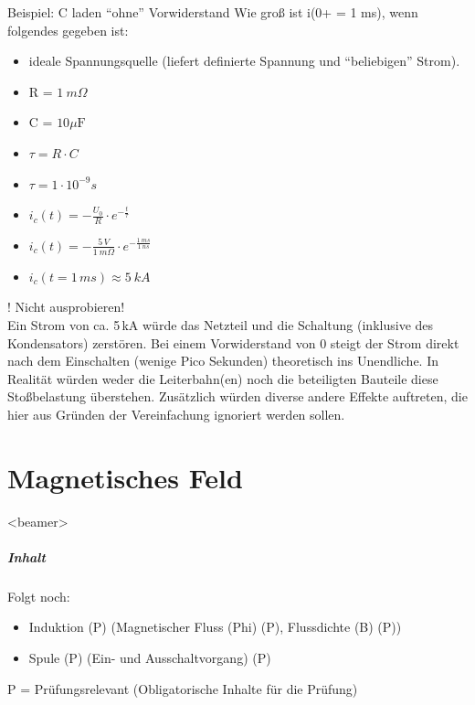 \begin{frame}{Beispiel: C laden "`ohne"' Vorwiderstand}
 Wie groß ist i(0+ = 1 ms), wenn folgendes gegeben ist:
 \begin{itemize}
  \item ideale Spannungsquelle (liefert definierte Spannung und "`beliebigen"' Strom).
  \item R = $1\ m\Omega$
  \item C = $10\mu \text{F}$
  \pause
  \item $\tau = R\cdot C$
  \item $\tau = 1\cdot 10^{-9}s$
  \pause
  \item $i_c(t) = -\frac{U_0}{R}\cdot e^{-\frac{t}{\tau}}$
  \item $i_c(t) = -\frac{5\, V}{1\ m\Omega}\cdot e^{-\frac{1\ ms}{1\  ns}}$
  \pause
  \item $i_c (t= 1\, ms) \approx 5\ kA$
 \end{itemize}
\end{frame}
! Nicht ausprobieren!\\
Ein Strom von ca. 5\,kA würde das Netzteil und die Schaltung (inklusive des Kondensators) zerstören. Bei einem Vorwiderstand von 0 steigt der Strom direkt nach dem Einschalten (wenige Pico Sekunden) theoretisch ins Unendliche. In Realität würden weder die Leiterbahn(en) noch die beteiligten Bauteile diese Stoßbelastung überstehen. Zusätzlich würden diverse andere Effekte auftreten, die hier aus Gründen der Vereinfachung ignoriert werden sollen.

\part{Magnetisches Feld}
\begin{frame}
  \partpage
  \hypertarget{Teil_2MagnetischesFeld}{}
  \hyperlink{Uebersicht}{}
\end{frame}

\begin{frame}<beamer>
  \frametitle{Inhalt}
    \tableofcontents
     Folgt noch:\\
    \begin{itemize}
     \item Induktion (P) (Magnetischer Fluss (Phi) (P), Flussdichte (B) (P))
    \item Spule (P) (Ein- und Ausschaltvorgang) (P)
    \end{itemize}
    P = Prüfungsrelevant (Obligatorische Inhalte für die Prüfung)
\end{frame}

